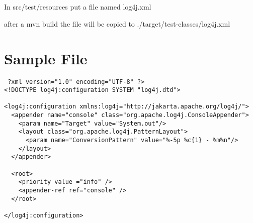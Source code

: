 \documentclass[a4paper,10pt]{article}
\title{}
\author{}
\begin{document}
\maketitle

\begin{abstract}

\end{abstract}

\section{}
In src/test/resources put a file named 
log4j.xml

after a mvn build the file will be copied to
./target/test-classes/log4j.xml

\section{Sample File}
\begin{verbatim}
 ?xml version="1.0" encoding="UTF-8" ?>
<!DOCTYPE log4j:configuration SYSTEM "log4j.dtd">

<log4j:configuration xmlns:log4j="http://jakarta.apache.org/log4j/">
  <appender name="console" class="org.apache.log4j.ConsoleAppender">
    <param name="Target" value="System.out"/>
    <layout class="org.apache.log4j.PatternLayout">
      <param name="ConversionPattern" value="%-5p %c{1} - %m%n"/>
    </layout>
  </appender>

  <root>
    <priority value ="info" />
    <appender-ref ref="console" />
  </root>

</log4j:configuration>

\end{verbatim}
\end{document}
